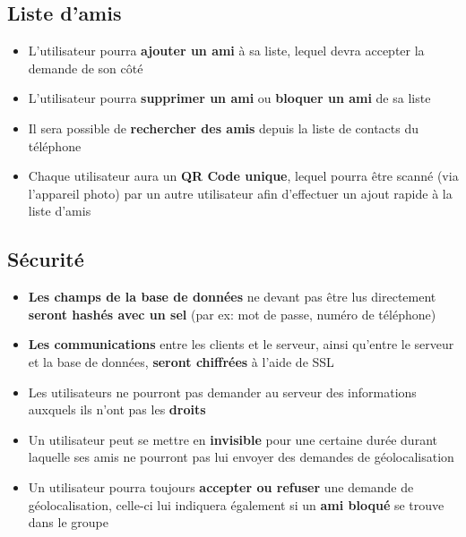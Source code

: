 \documentclass[french]{article}
\begin{document}
		\subsection{Liste d'amis}
			\begin{itemize}
				\item L'utilisateur pourra \textbf{ajouter un ami} à sa liste, lequel devra accepter la demande de son côté
				\item L'utilisateur pourra \textbf{supprimer un ami} ou \textbf{bloquer un ami} de sa liste
				\item Il sera possible de \textbf{rechercher des amis} depuis la liste de contacts du téléphone
				\item Chaque utilisateur aura un \textbf{QR Code unique}, lequel pourra être scanné (via l'appareil photo) par un autre utilisateur afin d'effectuer un ajout rapide à la liste d'amis 
			\end{itemize}
		
		\subsection{Sécurité}
			\begin{itemize}
				\item \textbf{Les champs de la base de données} ne devant pas être lus directement \textbf{seront hashés avec un sel} (par ex: mot de passe, numéro de téléphone)
				\item \textbf{Les communications} entre les clients et le serveur, ainsi qu'entre le serveur et la base de données, \textbf{seront chiffrées} à l'aide de SSL
				\item Les utilisateurs ne pourront pas demander au serveur des informations auxquels ils n'ont pas les \textbf{droits} 
				\item Un utilisateur peut se mettre en \textbf{invisible} pour une certaine durée durant laquelle ses amis ne pourront pas lui envoyer des demandes de géolocalisation
				\item Un utilisateur pourra toujours \textbf{accepter ou refuser} une demande de géolocalisation, celle-ci lui indiquera également si un \textbf{ami bloqué} se trouve dans le groupe
			\end{itemize}
		
\end{document}
